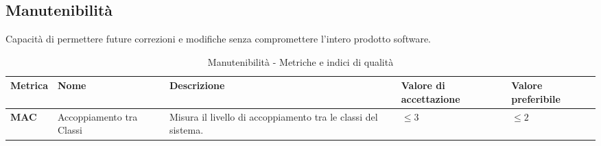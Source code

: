\subsection{Manutenibilità}
Capacità di permettere future correzioni e modifiche senza compromettere l’intero prodotto software.
\begin{table}[H]
    \centering
    \begin{tabular}{|C{1.5cm}|L{3cm}|L{4cm}|L{2.5cm}|L{2.5cm}|}
        \hline
        \textbf{Metrica} & \textbf{Nome} & \textbf{Descrizione} & \textbf{Valore di accettazione} & \textbf{Valore preferibile} \\
        \hline
        \textbf{MAC} & Accoppiamento tra Classi & Misura il livello di accoppiamento tra le classi del sistema. & $\leq 3$ & $\leq 2$ \\
        \hline
    \end{tabular}
    \caption{Manutenibilità - Metriche e indici di qualità}
    \label{tab:manutenibilità_qualita_prodotto}
\end{table}